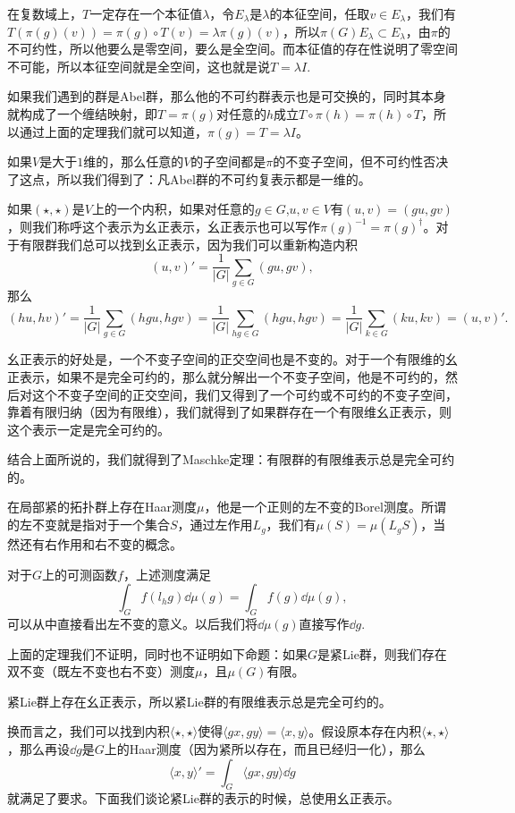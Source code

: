 在复数域上，$T$一定存在一个本征值$\lambda$，令$E_\lambda$是$\lambda$的本征空间，任取$v\in E_\lambda$，我们有$T(\pi(g)(v))=\pi(g)\circ T(v)=\lambda\pi(g)(v)$，所以$\pi(G)E_\lambda\subset E_\lambda$，由$\pi$的不可约性，所以他要么是零空间，要么是全空间。而本征值的存在性说明了零空间不可能，所以本征空间就是全空间，这也就是说$T=\lambda I$.

\para 如果我们遇到的群是Abel群，那么他的不可约群表示也是可交换的，同时其本身就构成了一个缠结映射，即$T=\pi(g)$对任意的$h$成立$T\circ \pi(h)=\pi(h)\circ T$，所以通过上面的定理我们就可以知道，$\pi(g)=T=\lambda I$。

如果$V$是大于$1$维的，那么任意的$V$的子空间都是$\pi$的不变子空间，但不可约性否决了这点，所以我们得到了：凡Abel群的不可约复表示都是一维的。

\para 如果$(\star,\star)$是$V$上的一个内积，如果对任意的$g\in G$,$u,v\in V$有$(u,v)=(gu,gv)$，则我们称呼这个表示为幺正表示，幺正表示也可以写作$\pi(g)^{-1}=\pi(g)^\dag$。对于有限群我们总可以找到幺正表示，因为我们可以重新构造内积
\[
	(u,v)'=\frac{1}{|G|}\sum_{g\in G}(gu,gv),
\]
那么
\[
	(hu,hv)'=\frac{1}{|G|}\sum_{g\in G}(hgu,hgv)=\frac{1}{|G|}\sum_{hg\in G}(hgu,hgv)=\frac{1}{|G|}\sum_{k\in G}(ku,kv)=(u,v)'.
\]

幺正表示的好处是，一个不变子空间的正交空间也是不变的。对于一个有限维的幺正表示，如果不是完全可约的，那么就分解出一个不变子空间，他是不可约的，然后对这个不变子空间的正交空间，我们又得到了一个可约或不可约的不变子空间，靠着有限归纳（因为有限维），我们就得到了如果群存在一个有限维幺正表示，则这个表示一定是完全可约的。

\theo 结合上面所说的，我们就得到了Maschke定理：有限群的有限维表示总是完全可约的。 

\theo 在局部紧的拓扑群上存在Haar测度$\mu$，他是一个正则的左不变的Borel测度。所谓的左不变就是指对于一个集合$S$，通过左作用$L_g$，我们有$\mu(S)=\mu(L_gS)$，当然还有右作用和右不变的概念。

对于$G$上的可测函数$f$，上述测度满足
\[
	\int_G f(l_h g)\dd \mu(g)=\int_G f(g)\dd \mu(g),
\]
可以从中直接看出左不变的意义。以后我们将$\dd \mu(g)$直接写作$\dd g$.

\para 上面的定理我们不证明，同时也不证明如下命题：如果$G$是紧Lie群，则我们存在双不变（既左不变也右不变）测度$\mu$，且$\mu(G)$有限。

\pro 紧Lie群上存在幺正表示，所以紧Lie群的有限维表示总是完全可约的。 

换而言之，我们可以找到内积$\langle \star,\star\rangle$使得$\langle gx,gy\rangle=\langle x,y\rangle$。假设原本存在内积$\langle \star,\star \rangle$，那么再设$\dd g$是$G$上的Haar测度（因为紧所以存在，而且已经归一化），那么
\[
	\langle x,y\rangle'=\int_G \langle gx,gy \rangle \dd g
\]
就满足了要求。下面我们谈论紧Lie群的表示的时候，总使用幺正表示。

